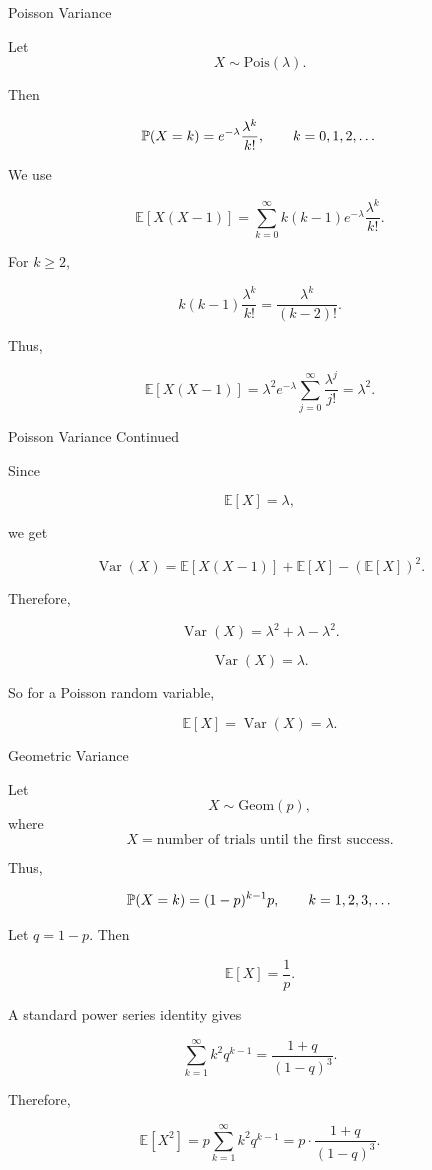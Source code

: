 
\begin{frame}{Poisson Variance}

Let
\[
X\sim \text{Pois}(\lambda).
\]

Then

\[
\mathbb{P}(X=k)=e^{-\lambda}\frac{\lambda^k}{k!},
\qquad k=0,1,2,\dots
\]

We use

\[
\mathbb{E}[X(X-1)]
=
\sum_{k=0}^\infty k(k-1)e^{-\lambda}\frac{\lambda^k}{k!}.
\]

For $k\geq 2$,

\[
k(k-1)\frac{\lambda^k}{k!}
=
\frac{\lambda^k}{(k-2)!}.
\]

Thus,

\[
\mathbb{E}[X(X-1)]
=
\lambda^2 e^{-\lambda}
\sum_{j=0}^\infty \frac{\lambda^j}{j!}
=
\lambda^2.
\]

\end{frame}


\begin{frame}{Poisson Variance Continued}

Since

\[
\mathbb{E}[X]=\lambda,
\]

we get

\[
\operatorname{Var}(X)
=
\mathbb{E}[X(X-1)]+\mathbb{E}[X]-(\mathbb{E}[X])^2.
\]

Therefore,

\[
\operatorname{Var}(X)
=
\lambda^2+\lambda-\lambda^2.
\]

\[
{
\operatorname{Var}(X)=\lambda.
}
\]

\vspace{0.25cm}

So for a Poisson random variable,

\[
{
\mathbb{E}[X]=\operatorname{Var}(X)=\lambda.
}
\]

\end{frame}


\begin{frame}{Geometric Variance}

Let
\[
X\sim \text{Geom}(p),
\]
where
\[
X=\text{number of trials until the first success}.
\]

Thus,

\[
\mathbb{P}(X=k)=(1-p)^{k-1}p,
\qquad k=1,2,3,\dots
\]

Let $q=1-p.$ Then

\[
\mathbb{E}[X]=\frac1p.
\]

A standard power series identity gives

\[
\sum_{k=1}^\infty k^2 q^{k-1}
=
\frac{1+q}{(1-q)^3}.
\]

Therefore,

\[
\mathbb{E}[X^2]
=
p\sum_{k=1}^\infty k^2q^{k-1}
=
p\cdot \frac{1+q}{(1-q)^3}.
\]

\end{frame}

